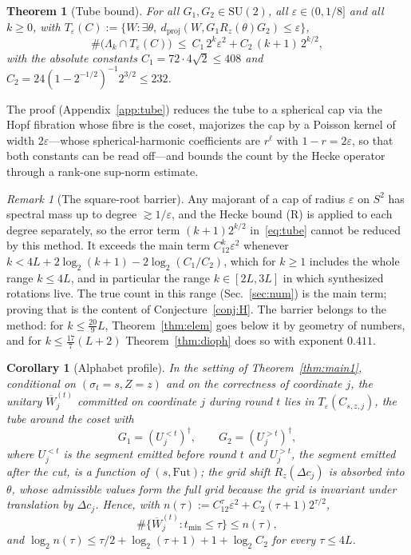 \documentclass[aps,prx,twocolumn,superscriptaddress,nofootinbib,longbibliography]{revtex4-2}
\theoremstyle{plain}
\newtheorem{theorem}{Theorem}
\newtheorem{corollary}{Corollary}
\theoremstyle{definition}
\theoremstyle{remark}
\newtheorem{remark}{Remark}
\newcommand{\dproj}{d_{\mathrm{proj}}}
\newcommand{\SU}{\mathrm{SU}(2)}
\begin{document}
\begin{theorem}[Tube bound]\label{thm:tube}
For all $G_1,G_2\in\SU$, all $\varepsilon\in(0,1/8]$ and all $k\ge0$, with
$T_\varepsilon(C):=\{W:\exists\theta,\ \dproj(W,G_1R_z(\theta)G_2)\le\varepsilon\}$,
\begin{equation}\label{eq:tube}
\#\big(\Lambda_k\cap T_\varepsilon(C)\big)\ \le\ C_1\,2^k\varepsilon^2+C_2\,(k+1)\,2^{k/2},
\end{equation}
with the absolute constants $C_1=72\cdot4\sqrt2\le408$ and $C_2=24(1-2^{-1/2})^{-1}2^{3/2}\le232$.
\end{theorem}
The proof (Appendix~\ref{app:tube}) reduces the tube to a spherical cap via the Hopf fibration whose fibre is the coset, majorizes the cap by a Poisson kernel of width $2\varepsilon$---whose spherical-harmonic coefficients are $r^\ell$ with $1-r=2\varepsilon$, so that both constants can be read off---and bounds the count by the Hecke operator through a rank-one sup-norm estimate.

\begin{remark}[The square-root barrier]\label{rem:barrier}
Any majorant of a cap of radius $\varepsilon$ on $S^2$ has spectral mass up to degree $\gtrsim1/\varepsilon$, and the Hecke bound (R) is applied to each degree separately, so the error term $(k+1)2^{k/2}$ in~\eqref{eq:tube} cannot be reduced by this method. It exceeds the main term $C_12^k\varepsilon^2$ whenever $k<4L+2\log_2(k+1)-2\log_2(C_1/C_2)$, which for $k\ge1$ includes the whole range $k\le4L$, and in particular the range $k\in[2L,3L]$ in which synthesized rotations live. The true count in this range (Sec.~\ref{sec:num}) is the main term; proving that is the content of Conjecture~\ref{conj:H}. The barrier belongs to the method: for $k\le\tfrac{20}9L$, Theorem~\ref{thm:elem} goes below it by geometry of numbers, and for $k\le\tfrac{17}7(L+2)$ Theorem~\ref{thm:dioph} does so with exponent $0.411$.
\end{remark}

\begin{corollary}[Alphabet profile]\label{cor:profile}
In the setting of Theorem~\ref{thm:main1}, conditional on $(\sigma_t=s,Z=z)$ and on the correctness of coordinate $j$, the unitary $\overline W^{(t)}_j$ committed on coordinate $j$ during round $t$ lies in $T_\varepsilon(C_{s,z,j})$, the tube around the coset with
\[G_1=(U^{<t}_j)^\dagger,\qquad G_2=(U^{>t}_j)^\dagger,\]
where $U^{<t}_j$ is the segment emitted before round $t$ and $U^{>t}_j$, the segment emitted after the cut, is a function of $(s,\mathrm{Fut})$; the grid shift $R_z(\Delta c_j)$ is absorbed into $\theta$, whose admissible values form the full grid because the grid is invariant under translation by $\Delta c_j$. Hence, with $n(\tau):=C_12^\tau\varepsilon^2+C_2(\tau+1)2^{\tau/2}$,
\[\#\{\overline W^{(t)}_j:t_{\min}\le\tau\}\le n(\tau),\]
and $\log_2n(\tau)\le\tau/2+\log_2(\tau+1)+1+\log_2C_2$ for every $\tau\le4L$.
\end{corollary}
\end{document}
